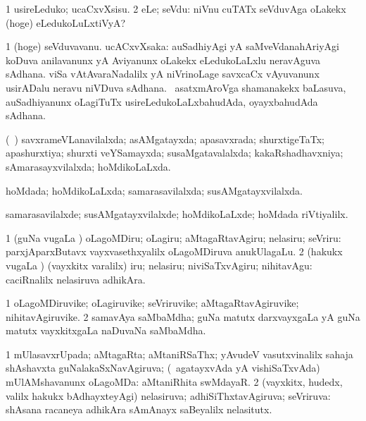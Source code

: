 \noindent 
\gl{\akirx}
\bmng
\bnum
\num{1} usireLeduko; ucaCxvXsisu. 
\num{2} eLe; seVdu:  niVnu cuTATx seVduvAga oLakekx (hoge) eLedukoLuLxtiVyA? 
\enum
\emng
\eentry

\bentry
{}
\gl{\nA}
\bmng
\bnum
\num{1} (hoge) seVduvavanu. 
 ucACxvXsaka: 
\banum
{} auSadhiyAgi yA saMveVdanahAriyAgi koDuva anilavanunx yA Aviyanunx oLakekx eLedukoLaLxlu neravAguva sAdhana. 
 viSa vAtAvaraNadalilx yA niVrinoLage savxcaCx vAyuvanunx usirADalu neravu niVDuva sAdhana. 
 \kanmu\ asatxmAroVga shamanakekx baLasuva, auSadhiyanunx oLagiTuTx usireLedukoLaLxbahudAda, oyayxbahudAda sAdhana. 
\eanum
\numie
\enum
\emng
\eentry

\bentry
{}
\gl{\gu}
\bmng
(\kanmu\ \saM) savxrameVLanavilalxda; asAMgatayxda; apasavxrada; shurxtigeTaTx; apashurxtiya; shurxti veYSamayxda; susaMgatavalalxda; kakaRshadhavxniya; sAmarasayxvilalxda; hoMdikoLaLxda. 
\emng
\eentry

\bentry
{}
\gl{\gu}
\bmng
hoMdada; hoMdikoLaLxda; samarasavilalxda; susAMgatayxvilalxda. 
\emng
\eentry

\bentry
{}
\gl{\kirxvi}
\bmng
samarasavilalxde; susAMgatayxvilalxde; hoMdikoLaLxde; hoMdada riVtiyalilx. 
\emng
\eentry

\bentry
{}
\gl{\akirx}
\bmng
\bnum
\num{1} (guNa \mo vugaLa \vi) oLagoMDiru; oLagiru; aMtagaRtavAgiru; nelasiru; seVriru:  parxjAparxButavx vayxvasethxyalilx oLagoMDiruva anukUlagaLu. 
\num{2} (hakukx \mo vugaLa \vi) (vayxkitx \mo varalilx) iru; nelasiru; niviSaTxvAgiru; nihitavAgu:  caciRnalilx nelasiruva adhikAra. 
\enum
\emng
\eentry

\bentry
{}
\gl{\nA}
\bmng
\bnum
\num{1} oLagoMDiruvike; oLagiruvike; seVriruvike; aMtagaRtavAgiruvike; nihitavAgiruvike. 
\num{2} samavAya saMbaMdha; guNa matutx darxvayxgaLa yA guNa matutx vayxkitxgaLa naDuvaNa saMbaMdha. 
\enum
\emng
\eentry

\bentry
{}
\gl{\gu}
\bmng
\bnum
\num{1} mUlasavxrUpada; aMtagaRta; aMtaniRSaThx; yAvudeV vasutxvinalilx sahaja shAshavxta guNalakaSxNavAgiruva; (\kanmu\ agatayxvAda yA vishiSaTxvAda) mUlAMshavanunx oLagoMDa:  aMtaniRhita swMdayaR. 
\num{2} (vayxkitx, hudedx, \mo valilx hakukx bAdhayxteyAgi) nelasiruva; adhiSiThxtavAgiruva; seVriruva:  shAsana racaneya adhikAra sAmAnayx saBeyalilx nelasitutx. 
\enum
\emng
\eentry

